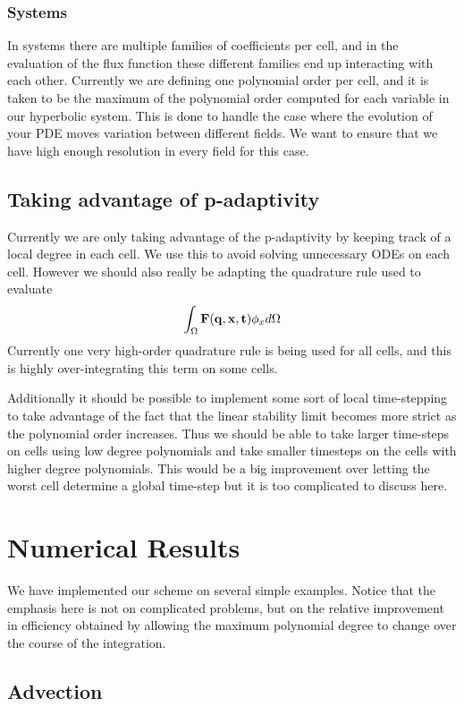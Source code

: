 \documentclass[10]{amsart}
\begin{document}
\subsubsection{Systems}
In systems there are multiple families of coefficients per cell, and in the evaluation of the 
flux function these different families end up interacting with each other. Currently we are defining
one polynomial order per cell, and it is taken to be the maximum of the polynomial order computed for each variable
in our hyperbolic system. This is done to handle the case where the evolution of your PDE moves variation between different
fields. We want to ensure that we have high enough resolution in every field for this case. 

\subsection{Taking advantage of p-adaptivity}
Currently we are only taking advantage of the p-adaptivity by keeping track
of a local degree in each cell. We use this to avoid solving unnecessary ODEs
on each cell. However we should also really be adapting the quadrature rule used to evaluate
$$\int_{\Omega}{\bf F(q,x,t)} \phi_x d\Omega$$
Currently one very high-order quadrature rule is being used for all cells, and this
is highly over-integrating this term on some cells. 

Additionally it should be possible to implement some sort of local time-stepping to take
advantage of the fact that the linear stability limit becomes more strict as the polynomial order increases.
Thus we should be able to take larger time-steps on cells using low degree polynomials
and take smaller timesteps on the cells with higher degree polynomials. This would be a big improvement
over letting the worst cell determine a global time-step but it is too complicated to discuss here.

\section{Numerical Results}

We have implemented our scheme on several simple examples. Notice that the emphasis here is not on complicated problems, but on the relative improvement in efficiency obtained by allowing the maximum polynomial degree to change over the course of the integration.

\subsection{Advection}
\end{document}
